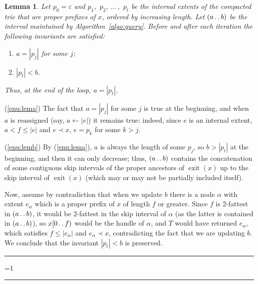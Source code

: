 \documentclass{article}
\newtheorem{lemma}{Lemma}
\newcounter{noqed}
\newcommand{\qed}{ \ifmmode\mbox{ }\fi\rule[-.05em]{.3em}{.7em}\setcounter{noqed}{0}}
\newenvironment{proof}[1][{}]{\noindent{\bf Proof#1. }\setcounter{noqed}{1}}{\ifnum\value{noqed}=1\qed\fi\par\medskip}
\newcommand{\exit}[1]{\operatorname{exit}(#1)}
\newcommand{\?}{\mskip1.5mu}
\def\..{\,\mathpunct{\ldotp\ldotp}} %
\renewcommand{\epsilon}{\varepsilon}
\begin{document}
\begin{lemma}\label{lem:correctness}
Let $p_0=\epsilon$ and $p_1$,~$p_2$,
$\dots\,$,~$p_t$ be the internal extents of the compacted
trie that are \emph{proper} prefixes of $x$, ordered by increasing length. 
Let $(a\..b)$ be the interval maintained by 
Algorithm~\ref{algo:query}. Before and after each iteration the following invariants 
are satisfied: 
\begin{enumerate}
    \item\label{enu:lema} $a=|p_j|$ for some $j$;
    \item\label{enu:lemb} $|p_t|< b$.
\end{enumerate}
Thus, at the end of the loop, $a=|p_t|$.
\end{lemma}
\begin{proof}
\noindent(\ref{enu:lema})
The fact that $a=|p_j|$ for some $j$ is true at the beginning, and when
$a$ is reassigned (say, $a \leftarrow |e|$) it remains true: indeed, since $e$
is an internal extent, $a<f\leq |e|$ and $e\prec x$, $e=p_k$ for some $k>j$.

\noindent(\ref{enu:lemb})
By (\ref{enu:lema}), $a$ is always the length of some $p_j$,
so $b>|p_t|$ at the beginning, and then it can only decrease; thus,
$(a\..b)$ contains the concatenation of some contiguous skip intervals of the
proper ancestors of $\exit x$ up to the skip interval of $\exit x$ (which may
or may not be partially included itself).

Now, assume by contradiction that when we update $b$ there is a node $\alpha$
with extent $e_\alpha$ which is a proper
prefix of $x$ of length $f$ or greater. Since $f$ is 2-fattest in $(a\..b)$, it
would be 2-fattest in the skip interval of $\alpha$ (as the latter is contained
in $(a\..b)$), so $x[0\..f)$ would be the handle of $\alpha$, and $T$ would have
returned $e_\alpha$, which satisfies $f\leq |e_\alpha|$ and $e_\alpha\prec x$, contradicting the fact that we are
updating $b$. We conclude that the invariant $|p_t|<b$ is preserved.\qed
\end{proof}
\end{document}
